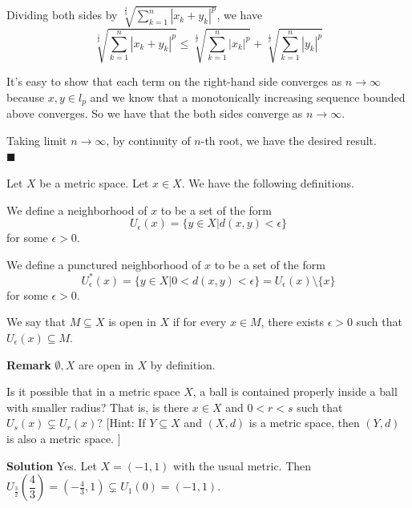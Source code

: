 \documentclass[main.tex]{subfiles}
\begin{document}
\par Dividing both sides by $\sqrt[\frac{1}{q}]{\sum_{k=1}^{n} |x_k + y_k|^p}$, we have
\begin{equation}
    \sqrt[\frac{1}{p}]{\sum_{k=1}^{n} |x_k + y_k|^p} \le \sqrt[\frac{1}{p}]{\sum_{k=1}^{n} |x_k|^p} + \sqrt[\frac{1}{p}]{\sum_{k=1}^{n} |y_k|^p}
\end{equation}
\par It's easy to show that each term on the right-hand side converges as $n \to \infty$ because $x, y \in l_p$ and we know that a monotonically increasing sequence bounded above converges. So we have that the both sides converge as $n \to \infty$. 
\par Taking limit $n \to \infty$, by continuity of $n$-th root, we have the desired result.
\\ \null \hfill $\blacksquare$ 

\par Let $X$ be a metric space. Let $x\in X$. We have the following definitions.
\begin{definition}
    We define a neighborhood of $x$ to be a set of the form \[ U_{\epsilon} (x) = \{y \in X | d(x, y) < \epsilon \} \] for some $\epsilon > 0$.
\end{definition}
\begin{definition}
    We define a punctured neighborhood of $x$ to be a set of the form \[ U_{\epsilon}^{\ast} (x) = \{y \in X | 0 < d(x, y) < \epsilon \} = U_{\epsilon} (x) \setminus \{x\} \] for some $\epsilon > 0$. 
\end{definition}

\begin{definition}
    We say that $M \subseteq X$ is open in $X$ if for every $x \in M$, there exists $\epsilon > 0$ such that $U_{\epsilon} (x) \subseteq M$.
\end{definition}
\par \noindent \textbf{Remark} $\emptyset, X$ are open in $X$ by definition. 

\begin{example}
    Is it possible that in a metric space $X$, a ball is contained properly inside a ball with smaller radius? That is, is there $x \in X$ and $0 < r < s$ such that $U_s (x) \subsetneq U_r (x)$?
    [Hint: If $Y \subseteq X$ and $(X, d)$ is a metric space, then $(Y, d)$ is also a metric space. ]
\end{example}

\par \noindent \textbf{Solution} Yes. Let $X = (-1, 1)$ with the usual metric. Then $U_{\frac{3}{2}} (\dfrac{4}{3}) = (-\frac{4}{3}, 1) \subsetneq U_1 (0) = (-1, 1)$. 
\end{document}
